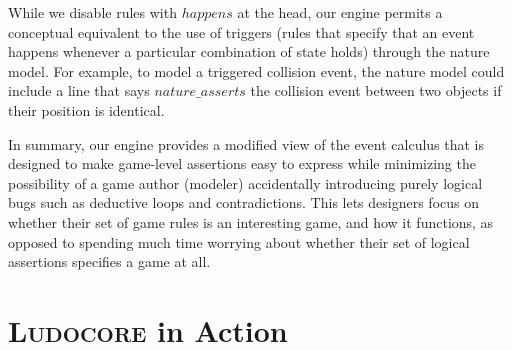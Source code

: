 \documentclass[letterpaper]{article}
\newcommand{\Ludocore}{\textsc{Ludocore}}
\newcommand{\logical}[1]{$#1$}
\begin{document}
While we disable rules with \logical{happens} at the head, our engine permits a
conceptual equivalent to the use of triggers (rules that specify that an event
happens whenever a particular combination of state holds) through the nature
model. For example, to model a triggered collision event, the nature model
could include a line that says \logical{nature\_asserts} the collision event
between two objects if their position is identical.

In summary, our engine provides a modified view of the event calculus that
is designed to make game-level assertions easy to express while minimizing the
possibility of a game author (modeler) accidentally introducing purely logical
bugs such as deductive loops and contradictions.  This lets designers focus on
whether their set of game rules is an interesting game, and how it functions,
as opposed to spending much time worrying about whether their set of logical
assertions specifies a game at all.

%
%
%

\section{\Ludocore{} in Action}
\end{document}
